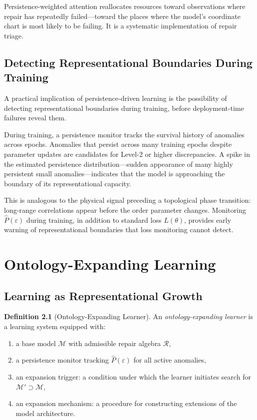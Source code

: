 \documentclass[12pt,oneside]{book}
\theoremstyle{plain}
\theoremstyle{definition}
\newtheorem{definition}[theorem]{Definition}
\theoremstyle{remark}
\newcommand{\R}{\mathcal{R}}
\newcommand{\M}{\mathcal{M}}
\newcommand{\eps}{\varepsilon}
\newcommand{\1}{\mathbf{1}}
\begin{document}
Persistence-weighted attention reallocates resources toward observations where repair has repeatedly failed---toward the places where the model's coordinate chart is most likely to be failing. It is a systematic implementation of repair triage.

\section{Detecting Representational Boundaries During Training}

A practical implication of persistence-driven learning is the possibility of detecting representational boundaries during training, before deployment-time failures reveal them.

During training, a persistence monitor tracks the survival history of anomalies across epochs. Anomalies that persist across many training epochs despite parameter updates are candidates for Level-2 or higher discrepancies. A spike in the estimated persistence distribution---sudden appearance of many highly persistent small anomalies---indicates that the model is approaching the boundary of its representational capacity.

This is analogous to the physical signal preceding a topological phase transition: long-range correlations appear before the order parameter changes. Monitoring $\hat{P}(\eps)$ during training, in addition to standard loss $L(\theta)$, provides early warning of representational boundaries that loss monitoring cannot detect.


\chapter{Ontology-Expanding Learning}

\section{Learning as Representational Growth}

\begin{definition}[Ontology-Expanding Learner]
An \emph{ontology-expanding learner} is a learning system equipped with:
\begin{enumerate}[label=(\roman*)]
\item a base model $\M$ with admissible repair algebra $\R$,
\item a persistence monitor tracking $\hat{P}(\eps)$ for all active anomalies,
\item an expansion trigger: a condition under which the learner initiates search for $\M' \supset \M$,
\item an expansion mechanism: a procedure for constructing extensions of the model architecture.
\end{enumerate}
\end{definition}
\end{document}
